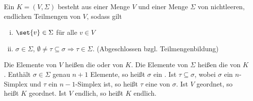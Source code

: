 \begin{definition}[{name=[simplizialer Komplex]}]
	Ein  $K=(V, \Sigma)$ besteht aus einer Menge $V$ und einer Menge $\Sigma$ von nichtleeren, endlichen Teilmengen von $V$, sodass gilt
	\begin{enumerate}[(i)]
		\item $\set{v} \in \Sigma$ für alle $v \in V$
		\item $\sigma \in \Sigma$, $\emptyset \not= \tau \subseteq \sigma \Longrightarrow \tau \in\Sigma.$ \hfill {\footnotesize(Abgeschlossen bzgl. Teilmengenbildung)}
	\end{enumerate}
	Die Elemente von $V$ heißen die  oder  von $K$. 
	Die Elemente von $\Sigma$ heißen die  von $K$. 
	Enthält $\sigma \in \Sigma$ genau $n+1$ Elemente, so heißt $\sigma$ ein . 
	Ist $\tau \subseteq \sigma$, wobei $\sigma$ ein $n$-Simplex und $\tau$ ein $n-1$-Simplex ist, so heißt $\tau$ eine  von $\sigma$. 
	Ist $V$ geordnet, so heißt $K$ geordnet. Ist $V$ endlich, so heißt $K$ endlich.
\end{definition}


